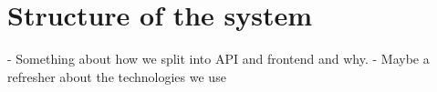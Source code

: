 \section{Structure of the system}
- Something about how we split into API and frontend and why. 
- Maybe a refresher about the technologies we use